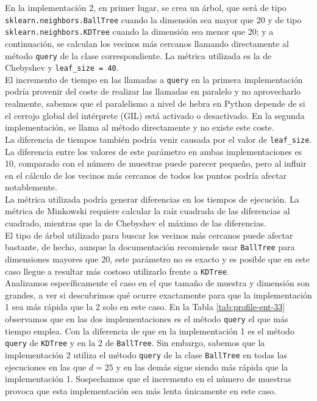 \documentclass[12pt,a4paper]{report} %
\theoremstyle{definition}
\begin{document}
En la implementación 2, en primer lugar, se crea un árbol, que será de tipo \texttt{sklearn.neighbors.BallTree} cuando la dimensión sea mayor que 20 y de tipo \texttt{sklearn.neighbors.KDTree} cuando la dimensión sea menor que 20; y a continuación, se calculan los vecinos más cercanos llamando directamente al método \texttt{query} de la clase correspondiente. La métrica utilizada es la de Chebyshev y \texttt{leaf\_size = 40}.\\

El incremento de tiempo en las llamadas a \texttt{query} en la primera implementación podría provenir del coste de realizar las llamadas en paralelo y no aprovecharlo realmente, sabemos que el paralelismo a nivel de hebra en Python depende de si el cerrojo global del intérprete (GIL) está activado o desactivado. En la segunda implementación,  se llama al método directamente y no existe este coste.\\

La diferencia de tiempos también podría venir causada por el valor de \texttt{leaf\_size}. La diferencia entre los valores de este parámetro en ambas implementaciones es 10, comparado con el número de muestras puede parecer pequeño, pero al influir en el cálculo de los vecinos más cercanos de todos los puntos podría afectar notablemente.\\

La métrica utilizada podría generar diferencias en los tiempos de ejecución. La métrica de Minkowski requiere calcular la raíz cuadrada de las diferencias al cuadrado, mientras que la de Chebyshev el máximo de las diferencias.\\ 

El tipo de árbol utilizado para buscar los vecinos más cercanos puede afectar bastante, de hecho, aunque la documentación recomiende usar \texttt{BallTree} para dimensiones mayores que 20, este parámetro no es exacto y es posible que en este caso llegue a resultar más costoso utilizarlo frente a \texttt{KDTree}.\\

Analizamos específicamente el caso en el que tamaño de muestra y dimensión son grandes, a ver si descubrimos qué ocurre exactamente para que la implementación 1 sea más rápida que la 2 solo en este caso. En la Tabla \ref{tab:profile-ent-33} observamos que en las dos implementaciones es el método \texttt{query} el que más tiempo emplea. Con la diferencia de que en la implementación 1 es el método \texttt{query} de \texttt{KDTree} y en la 2 de \texttt{BallTree}. Sin embargo, sabemos que la implementación 2 utiliza el método \texttt{query} de la clase \texttt{BallTree} en todas las ejecuciones en las que $d= 25$ y en las demás sigue siendo más rápida que la implementación 1. Sospechamos que el incremento en el número de muestras provoca que esta implementación sea más lenta únicamente en este caso.\\
\end{document}
